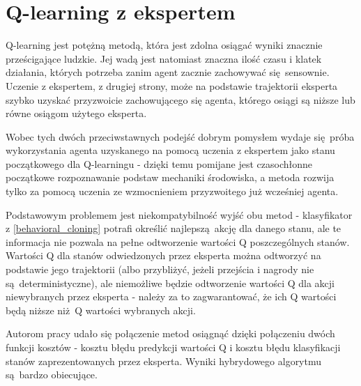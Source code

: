 \section{Q-learning z ekspertem}
Q-learning jest potężną metodą, która jest zdolna osiągać wyniki znacznie prześcigające ludzkie. Jej wadą jest natomiast znaczna ilość czasu i klatek działania, których potrzeba zanim agent zacznie zachowywać się sensownie. Uczenie z ekspertem, z drugiej strony, może na podstawie trajektorii eksperta szybko uzyskać przyzwoicie zachowującego się agenta, którego osiągi są niższe lub równe osiągom użytego eksperta.

Wobec tych dwóch przeciwstawnych podejść dobrym pomysłem wydaje się próba wykorzystania agenta uzyskanego na pomocą uczenia z ekspertem jako stanu początkowego dla Q-learningu - dzięki temu pomijane jest czasochłonne początkowe rozpoznawanie podstaw mechaniki środowiska, a metoda rozwija tylko za pomocą uczenia ze wzmocnieniem przyzwoitego już wcześniej agenta.

Podstawowym problemem jest niekompatybilność wyjść obu metod - klasyfikator z \ref{behavioral_cloning} potrafi określić najlepszą akcję dla danego stanu, ale te informacja nie pozwala na pełne odtworzenie wartości Q poszczególnych stanów. Wartości Q dla stanów odwiedzonych przez eksperta można odtworzyć na podstawie jego trajektorii (albo przybliżyć, jeżeli przejścia i nagrody nie są deterministyczne), ale niemożliwe będzie odtworzenie wartości Q dla akcji niewybranych przez eksperta - należy za to zagwarantować, że ich Q wartości będą niższe niż Q wartości wybranych akcji.

Autorom pracy \cite{DBLP:journals/corr/HesterVPLSPSDOA17} udało się połączenie metod osiągnąć dzięki połączeniu dwóch funkcji kosztów - kosztu błędu predykcji wartości Q i kosztu błędu klasyfikacji stanów zaprezentowanych przez eksperta. Wyniki hybrydowego algorytmu są bardzo obiecujące.
